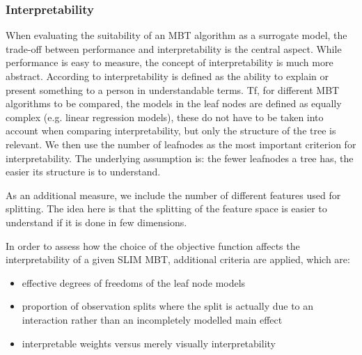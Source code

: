 \subsubsection{Interpretability}
When evaluating the suitability of an MBT algorithm as a surrogate model, the trade-off between performance and interpretability is the central aspect. While performance is easy to measure, the concept of interpretability is much more abstract.
According to \citet{DoshiVelez.2017} interpretability is defined as the ability to explain or present something to a person in understandable terms. Tf, for different MBT algorithms to be compared, the models in the leaf nodes are defined as equally complex (e.g. linear regression models), these do not have to be taken into account when comparing interpretability, but only the structure of the tree is relevant. We then use the number of leafnodes as the most important criterion for interpretability.  The underlying assumption is: the fewer leafnodes a tree has, the easier its structure is to understand.

As an additional measure, we include the number of different features used for splitting. The idea here is that the splitting of the feature space is easier to understand if it is done in few dimensions.

\vspace{0.5cm}

In order to assess how the choice of the objective function affects the interpretability of a given SLIM MBT, additional criteria are applied, which are:
\begin{itemize}
    \item effective degrees of freedoms of the leaf node models
    \item proportion of observation splits where the split is actually due to an interaction rather than an incompletely modelled main effect
    \item interpretable weights versus merely visually interpretability
\end{itemize}

